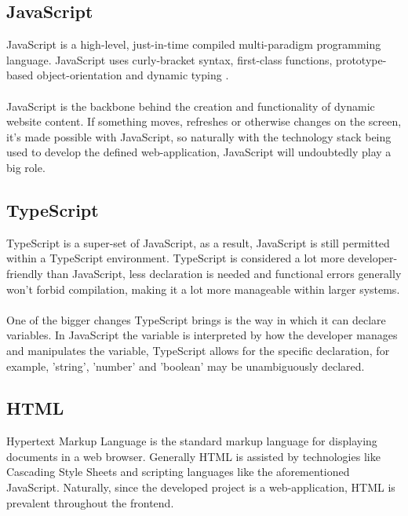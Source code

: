 \subsection{JavaScript}
JavaScript is a high-level, just-in-time compiled multi-paradigm programming language. JavaScript uses curly-bracket syntax, first-class functions, prototype-based object-orientation and dynamic typing \cite{JAVASCRIPT}.

\paragraph{}
JavaScript is the backbone behind the creation and functionality of dynamic website content. If something moves, refreshes or otherwise changes on the screen, it's made possible with JavaScript, so naturally with the technology stack being used to develop the defined web-application, JavaScript will undoubtedly play a big role.

\subsection{TypeScript}
TypeScript is a super-set of JavaScript, as a result, JavaScript is still permitted within a TypeScript environment. TypeScript is considered a lot more developer-friendly than JavaScript, less declaration is needed and functional errors generally won't forbid compilation, making it a lot more manageable within larger systems.

\paragraph{}
One of the bigger changes TypeScript brings is the way in which it can declare variables. In JavaScript the variable is interpreted by how the developer manages and manipulates the variable, TypeScript allows for the specific declaration, for example, 'string', 'number' and 'boolean' may be unambiguously declared.

\subsection{HTML}
Hypertext Markup Language is the standard markup language for displaying documents in a web browser. Generally HTML is assisted by technologies like Cascading Style Sheets and scripting languages like the aforementioned JavaScript. Naturally, since the developed project is a web-application, HTML is prevalent throughout the frontend.

